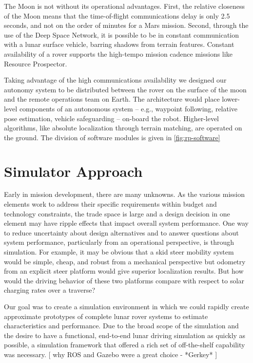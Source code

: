 \documentclass[twocolumn,letterpaper]{IEEEAerospaceCLS}  %
\begin{document}
The Moon is not without its operational advantages.  
First, the relative closeness of the Moon means that the time-of-flight communications delay is only 2.5 seconds, and not on the order of minutes for a Mars mission.  
Second, through the use of the Deep Space Network, it is possible to be in constant communication with a lunar surface vehicle, barring shadows from terrain features.  
Constant availability of a rover supports the high-tempo mission cadence missions like Resource Prospector.


Taking advantage of the high communications availability we designed our autonomy system to be distributed between the rover on the surface of the moon and the remote operations team on Earth.  
The architecture would place lower-level components of an autonomous system -- e.g., waypoint following, relative pose estimation, vehicle safeguarding  -- on-board the robot.  
Higher-level algorithms, like absolute localization through terrain matching, are operated on the ground.  
The division of software modules is given in \cref{fig:rp-software}



\section{Simulator Approach}

Early in mission development, there are many unknowns. 
As the various mission elements work to address their specific requirements within budget and technology constraints, the trade space is large and a design decision in one element may have ripple effects that impact overall system performance. 
One way to reduce uncertainty about design alternatives and to answer questions about system performance, particularly from an operational perspective, is through simulation. 
For example, it may be obvious that a skid steer mobility system would be simple, cheap, and robust from a mechanical perspective but odometry from an explicit steer platform would give superior localization results. 
But how would the driving behavior of these two platforms compare with respect to solar charging rates over a traverse? 

Our goal was to create a simulation environment in which we could rapidly create approximate prototypes of complete lunar rover systems to estimate characteristics and performance. 
Due to the broad scope of the simulation and the desire to have a functional, end-to-end lunar driving simulation as quickly as possible, a simulation framework that offered a rich set of off-the-shelf capability was necessary. 
[ why ROS and Gazebo were a great choice - *Gerkey* ] 
\end{document}
